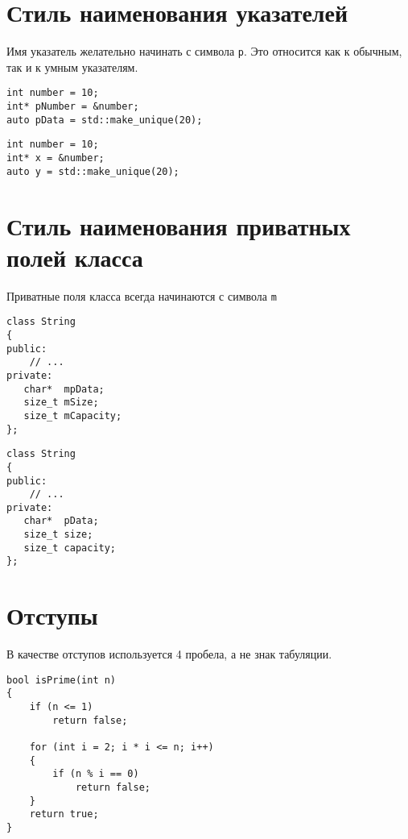 \documentclass{article}
\begin{document}
\section{Стиль наименования указателей}
Имя указатель желательно начинать с символа \texttt{p}. Это относится как к обычным, так и к умным указателям.
\begin{multicols}{2}
\noindent
\begin{lstlisting}[backgroundcolor = \color{correctcolor}]
int number = 10;
int* pNumber = &number;
auto pData = std::make_unique(20);
\end{lstlisting}
\vfill
\begin{lstlisting}[backgroundcolor = \color{wrongcolor}]
int number = 10;
int* x = &number;
auto y = std::make_unique(20);
\end{lstlisting}
\end{multicols}

\newpage
\section{Стиль наименования приватных полей класса}
Приватные поля класса всегда начинаются с символа \texttt{m}
\begin{multicols}{2}
\noindent
\begin{lstlisting}[backgroundcolor = \color{correctcolor}]
class String
{
public:
    // ...
private:
   char*  mpData;
   size_t mSize;
   size_t mCapacity;
};
\end{lstlisting}
\vfill
\begin{lstlisting}[backgroundcolor = \color{wrongcolor}]
class String
{
public:
    // ...
private:
   char*  pData;
   size_t size;
   size_t capacity;
};
\end{lstlisting}
\end{multicols}

\section{Отступы}
В качестве отступов используется 4 пробела, а не знак табуляции.

\newpage
\begin{lstlisting}[backgroundcolor = \color{correctcolor}]
bool isPrime(int n)
{
    if (n <= 1)
        return false;
 
    for (int i = 2; i * i <= n; i++)
    {
        if (n % i == 0)
            return false;
    }
    return true;
}
\end{lstlisting}
\end{document}
